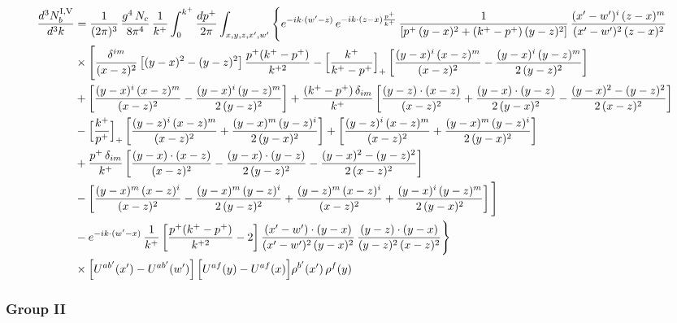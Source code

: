 \documentclass[9pt]{article}
\numberwithin{equation}{section}
\begin{document}
\begin{align}
\frac{d^{3}N^{\rm I,V}_{b}}{d^{3}k} & =\frac{1}{(2\pi)^{3}}\,\frac{g^{4}\,N_{c}}{8\pi^{4}}\,\frac{1}{k^{+}}\int_{0}^{k^{+}}\frac{dp^{+}}{2\pi}\int_{x,y,z,x',w'}\Bigg\{e^{-ik\cdot(w'-z)}\,e^{-ik\cdot(z-x)\frac{p^{+}}{k^{+}}}\,\frac{1}{\left[p^{+}\,(y-x)^{2}+(k^{+}-p^{+})\,(y-z)^{2}\right]}\,\frac{(x'-w')^{i}\,(z-x)^{m}}{(x'-w')^{2}\,(z-x)^{2}}\notag\\
&\times\Bigg[\frac{\delta^{im}}{(x-z)^{2}}\left[(y-x)^{2}-(y-z)^{2}\right]\frac{p^{+}(k^{+}-p^{+})}{k^{+2}}
-\Big[\frac{k^{+}}{k^{+}-p^{+}}\Big]_{+}\left[\frac{(y-x)^{i}\,(x-z)^{m}}{(x-z)^{2}}-\frac{(y-x)^{i}\,(y-z)^{m}}{2\,(y-z)^{2}}\right]\notag\\
&+\left[\frac{(y-x)^{i}\,(x-z)^{m}}{(x-z)^{2}}-\frac{(y-x)^{i}\,(y-z)^{m}}{2\,(y-z)^{2}}\right]
+\frac{(k^{+}-p^{+})\,\delta_{im}}{k^{+}}\left[\frac{(y-z)\cdot(x-z)}{(x-z)^{2}}+\frac{(y-x)\cdot(y-z)}{2\,(y-x)^{2}}-\frac{(y-x)^{2}-(y-z)^{2}}{2\,(x-z)^{2}}\right]\notag\\
&-\Big[\frac{k^{+}}{p^{+}}\Big]_{+}\left[\frac{(y-z)^{i}\,(x-z)^{m}}{(x-z)^{2}}+\frac{(y-x)^{m}\,(y-z)^{i}}{2\,(y-x)^{2}}\right]+\left[\frac{(y-z)^{i}\,(x-z)^{m}}{(x-z)^{2}}+\frac{(y-x)^{m}\,(y-z)^{i}}{2\,(y-x)^{2}}\right]\notag\\
&+\frac{p^{+}\,\delta_{im}}{k^{+}}\left[\frac{(y-x)\cdot(x-z)}{(x-z)^{2}}-\frac{(y-x)\cdot(y-z)}{2\,(y-z)^{2}}-\frac{(y-x)^{2}-(y-z)^{2}}{2\,(x-z)^{2}}\right]\notag\\
&-\left[\frac{(y-x)^{m}\,(x-z)^{i}}{(x-z)^{2}}-\frac{(y-x)^{m}\,(y-z)^{i}}{2\,(y-z)^{2}}+\frac{(y-z)^{m}\,(x-z)^{i}}{(x-z)^{2}}+\frac{(y-x)^{i}\,(y-z)^{m}}{2\,(y-x)^{2}}\right]\Bigg]\notag\\
&-e^{-ik\cdot(w'-x)}\,\frac{1}{k^{+}}\left[\frac{p^{+}(k^{+}-p^{+})}{k^{+2}}-2\right]\frac{(x'-w')\cdot(y-x)}{(x'-w')^{2}\,(y-x)^{2}}\,\frac{(y-z)\cdot(y-x)}{(y-z)^{2}\,(x-z)^{2}}\Bigg\}\notag\\
&\times\Big[U^{ab'}(x')-U^{ab'}(w')\Big]\,\Big[U^{af}(y)-U^{af}(x)\Big]\rho^{b'}(x')\,\rho^{f}(y)
\end{align}

\subsubsection{Group II}
\end{document}
